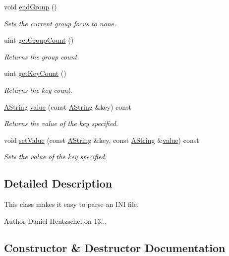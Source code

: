 \begin{DoxyCompactItemize}
void \mbox{\hyperlink{class_ini_file_ac01a3e9ffdf50392c12aff7b997bfbbd}{end\+Group}} ()
\begin{DoxyCompactList}\small\item\em Sets the current group focus to none. \end{DoxyCompactList}\item 
uint \mbox{\hyperlink{class_ini_file_a0ce59b29c1e5a6ed6d8f52ed276524c1}{get\+Group\+Count}} ()
\begin{DoxyCompactList}\small\item\em Returns the group count. \end{DoxyCompactList}\item 
uint \mbox{\hyperlink{class_ini_file_ad7a83aa937129895253cf853726826d6}{get\+Key\+Count}} ()
\begin{DoxyCompactList}\small\item\em Returns the key count. \end{DoxyCompactList}\item 
\mbox{\hyperlink{class_a_string}{A\+String}} \mbox{\hyperlink{class_ini_file_acb73544bb44139f7d9b23a36a666abf9}{value}} (const \mbox{\hyperlink{class_a_string}{A\+String}} \&key) const
\begin{DoxyCompactList}\small\item\em Returns the value of the key specified. \end{DoxyCompactList}\item 
void \mbox{\hyperlink{class_ini_file_a5d6fe5d2b2364c88376d49115007007f}{set\+Value}} (const \mbox{\hyperlink{class_a_string}{A\+String}} \&key, const \mbox{\hyperlink{class_a_string}{A\+String}} \&\mbox{\hyperlink{class_ini_file_acb73544bb44139f7d9b23a36a666abf9}{value}}) const
\begin{DoxyCompactList}\small\item\em Sets the value of the key specified. \end{DoxyCompactList}\end{DoxyCompactItemize}


\subsection{Detailed Description}
This class makes it easy to parse an I\+NI file. 

\begin{DoxyAuthor}{Author}
Daniel Hentzschel on 13... 
\end{DoxyAuthor}


\subsection{Constructor \& Destructor Documentation}
\mbox{\label{class_ini_file_a5cc166dcb8f8584e3ad4be81efbdbda9}} 
